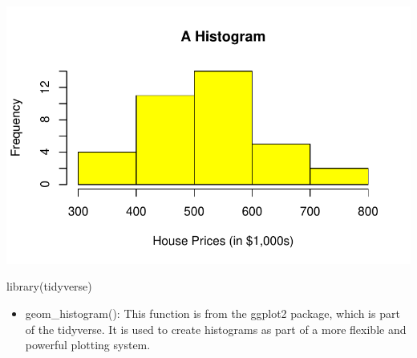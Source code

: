 \documentclass[
  letterpaper,
  DIV=11,
  numbers=noendperiod]{scrreprt}
\newenvironment{Shaded}{\begin{snugshade}}{\end{snugshade}}
\newcommand{\AttributeTok}[1]{\textcolor[rgb]{0.40,0.45,0.13}{#1}}
\newcommand{\CommentTok}[1]{\textcolor[rgb]{0.37,0.37,0.37}{#1}}
\newcommand{\DecValTok}[1]{\textcolor[rgb]{0.68,0.00,0.00}{#1}}
\newcommand{\FunctionTok}[1]{\textcolor[rgb]{0.28,0.35,0.67}{#1}}
\newcommand{\NormalTok}[1]{\textcolor[rgb]{0.00,0.23,0.31}{#1}}
\newcommand{\SpecialCharTok}[1]{\textcolor[rgb]{0.37,0.37,0.37}{#1}}
\newcommand{\StringTok}[1]{\textcolor[rgb]{0.13,0.47,0.30}{#1}}
\providecommand{\tightlist}{%
  \setlength{\itemsep}{0pt}\setlength{\parskip}{0pt}}\usepackage{longtable,booktabs,array}
\begin{document}
\includegraphics{descriptives_files/figure-pdf/unnamed-chunk-23-1.pdf}

\begin{Shaded}
\begin{Highlighting}[]
\FunctionTok{library}\NormalTok{(tidyverse)}
\end{Highlighting}
\end{Shaded}

\begin{itemize}
\tightlist
\item
  geom\_histogram(): This function is from the ggplot2 package, which is
  part of the tidyverse. It is used to create histograms as part of a
  more flexible and powerful plotting system.
\end{itemize}

\begin{Shaded}
\end{Shaded}
\end{document}
